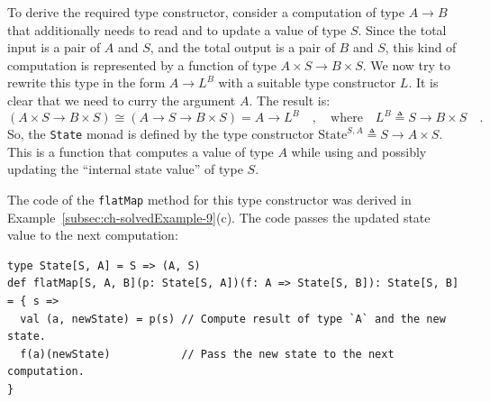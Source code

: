 To derive the required type constructor, consider a computation of
type $A\rightarrow B$ that additionally needs to read and to update
a value of type $S$. Since the total input is a pair of $A$ and
$S$, and the total output is a pair of $B$ and $S$, this kind of
computation is represented by a function of type $A\times S\rightarrow B\times S$.
We now try to rewrite this type in the form $A\rightarrow L^{B}$
with a suitable type constructor $L$. It is clear that we need to
curry the argument $A$. The result is:
\[
\left(A\times S\rightarrow B\times S\right)\cong\left(A\rightarrow S\rightarrow B\times S\right)=A\rightarrow L^{B}\quad,\quad\text{where}\quad L^{B}\triangleq S\rightarrow B\times S\quad.
\]
So, the \lstinline!State!
monad is defined by the type constructor $\text{State}^{S,A}\triangleq S\rightarrow A\times S$.
This is a function that computes a value of type $A$ while using
and possibly updating the \textsf{``}internal state value\textsf{''} of type $S$.

The code of the \lstinline!flatMap! method for this type constructor
was derived in Example~\ref{subsec:ch-solvedExample-9}(c). The code
passes the updated state value to the next computation:
\begin{lstlisting}
type State[S, A] = S => (A, S)
def flatMap[S, A, B](p: State[S, A])(f: A => State[S, B]): State[S, B] = { s =>
  val (a, newState) = p(s) // Compute result of type `A` and the new state.
  f(a)(newState)           // Pass the new state to the next computation.
}
\end{lstlisting}

